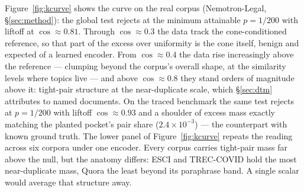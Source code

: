 \documentclass[11pt,letterpaper]{article}
\begin{document}
Figure~\ref{fig:kcurve} shows the curve on the real corpus
(Nemotron-Legal, \S\ref{sec:method}): the global test rejects at the
minimum attainable $p = 1/200$ with liftoff at $\cos \approx 0.81$.
Through $\cos \approx 0.3$ the data track the cone-conditioned
reference, so that part of the excess over uniformity is the cone
itself, benign and expected of a learned encoder. From
$\cos \approx 0.4$ the data rise increasingly above the reference ---
clumping beyond the corpus's overall shape, at the similarity levels
where topics live --- and above $\cos \approx 0.8$ they stand orders of
magnitude above it: tight-pair structure at the near-duplicate scale,
which \S\ref{sec:dtm} attributes to named documents.
On the traced benchmark the same test rejects at $p = 1/200$ with liftoff
$\cos \approx 0.93$ and a shoulder of excess mass exactly matching the
planted pocket's pair share ($2.4{\times}10^{-3}$) --- the counterpart
with known ground truth. The lower panel of Figure~\ref{fig:kcurve}
repeats the reading across six corpora under one encoder. Every corpus
carries tight-pair mass far above the null, but the anatomy differs: ESCI
and TREC-COVID hold the most near-duplicate mass, Quora the least beyond
its paraphrase band. A single scalar would average that structure away.
\end{document}
